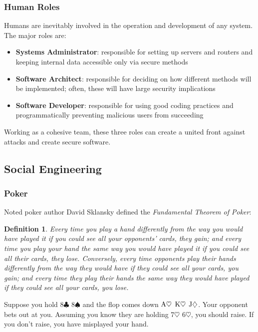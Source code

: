 \documentclass[aspectratio=169]{beamer}
\newtheorem{defn}{Definition}
\begin{document}
\begin{frame}
\frametitle{Human Roles}
Humans are inevitably involved in the operation and development of any system. The major roles are:
\begin{itemize}
	\item \textbf{Systems Administrator}: responsible for setting up servers and routers and keeping internal data accessible only via secure methods
	\item \textbf{Software Architect}: responsible for deciding on how different methods will be implemented; often, these will have large security implications
	\item \textbf{Software Developer}: responsible for using good coding practices and programmatically preventing malicious users from succeeding
\end{itemize}
Working as a cohesive team, these three roles can create a united front against attacks and create secure software.
\end{frame}

\subsection{Social Engineering}
\begin{frame}
\frametitle{Poker}
Noted poker author David Sklansky defined the \emph{Fundamental Theorem of Poker}: \cite{sklansky}
\begin{defn}
	Every time you play a hand differently from the way you would have played it if you could see all your opponents' cards, they gain; and every time you play your hand the same way you would have played it if you could see all their cards, they lose. Conversely, every time opponents play their hands differently from the way they would have if they could see all your cards, you gain; and every time they play their hands the same way they would have played if they could see all your cards, you lose.
\end{defn}
Suppose you hold $8 \clubsuit$ $8 \spadesuit$ and the flop comes down {\color{red} $\textnormal{A} \heartsuit$ $\textnormal{K} \heartsuit$ $\textnormal{J} \diamondsuit$}. Your opponent bets out at you. Assuming you know they are holding {\color{red} $7 \heartsuit$ $6 \heartsuit$}, you should raise. If you don't raise, you have misplayed your hand.
\end{frame}
\end{document}
